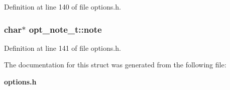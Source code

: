 Definition at line 140 of file options.h.
\subsubsection[{note}]{\setlength{\rightskip}{0pt plus 5cm}char$\ast$ {\bf opt\_\-note\_\-t::note}}\label{structopt__note__t_7bd6898a3102f5bc02c39dab075d5529}




Definition at line 141 of file options.h.

The documentation for this struct was generated from the following file:\begin{CompactItemize}
\item 
{\bf options.h}\end{CompactItemize}
